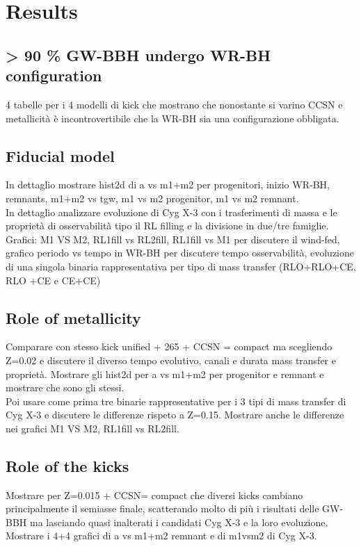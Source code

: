 \documentclass[a4paper,titlepage]{book}     	%
\begin{document}
\chapter{Results}
\section{> 90 \% GW-BBH undergo WR-BH configuration}
4 tabelle per i 4 modelli di kick che mostrano che nonostante si varino CCSN e metallicità è incontrovertibile che la WR-BH sia una configurazione obbligata.

\section{Fiducial model}
In dettaglio mostrare hist2d di a vs m1+m2 per progenitori, inizio WR-BH, remnants, m1+m2 vs tgw, m1 vs m2 progenitor, m1 vs m2 remnant.\\
In dettaglio analizzare evoluzione di Cyg X-3 con i trasferimenti di massa e le proprietà di osservabilità tipo il RL filling e la divisione in due/tre famiglie. Grafici: M1 VS M2, RL1fill vs RL2fill, RL1fill vs M1 per discutere il wind-fed, grafico periodo vs tempo in WR-BH per discutere tempo osservabilità, evoluzione di una singola binaria rappresentativa per tipo di mass transfer (RLO+RLO+CE, RLO +CE e CE+CE)

\section{Role of metallicity}
Comparare con stesso kick unified + 265 + CCSN = compact ma scegliendo Z=0.02 e discutere il diverso tempo evolutivo, canali e durata mass transfer e proprietà.
Mostrare gli hist2d per a vs m1+m2 per progenitor e remnant e mostrare che sono gli stessi.\\
Poi usare come prima tre binarie rappresentative per i 3 tipi di mass transfer di Cyg X-3 e discutere le differenze rispeto a Z=0.15. Mostrare anche le differenze nei grafici M1 VS M2, RL1fill vs RL2fill.


\section{Role of the kicks}
Mostrare per Z=0.015 + CCSN= compact che diversi kicks cambiano principalmente il semiasse finale, scatterando molto di più i risultati delle GW-BBH ma lasciando quasi inalterati i candidati Cyg X-3 e la loro evoluzione. Mostrare i 4+4 grafici di a vs m1+m2 remnant e di m1vsm2 di Cyg X-3.
\end{document}
